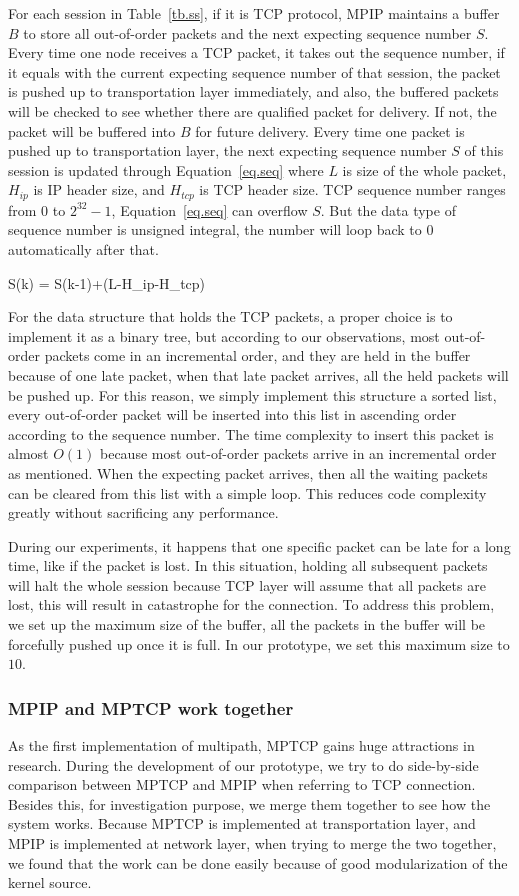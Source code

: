 For each session in Table~\ref{tb.ss}, if it is TCP protocol, MPIP maintains a buffer $B$ to store all out-of-order packets and the next expecting sequence number $S$. Every time one node receives a TCP packet, it takes out the sequence number, if it equals with the current expecting sequence number of that session, the packet is pushed up to transportation layer immediately, and also, the buffered packets will be checked to see whether there are qualified packet for delivery. If not, the packet will be buffered into $B$ for future delivery. Every time one packet is pushed up to transportation layer, the next expecting sequence number $S$ of this session is updated through Equation~\ref{eq.seq} where $L$ is size of the whole packet, $H_{ip}$ is IP header size, and $H_{tcp}$ is TCP header size. TCP sequence number ranges from $0$ to $2^{32}-1$, Equation~\ref{eq.seq} can overflow $S$. But the data type of sequence number is unsigned integral, the number will loop back to $0$ automatically after that. 

\be
\label{eq.seq}
S(k) = S(k-1)+(L-H_{ip}-H_{tcp})
\ee

For the data structure that holds the TCP packets, a proper choice is to implement it as a binary tree, but according to our observations, most out-of-order packets come in an incremental order, and they are held in the buffer because of one late packet, when that late packet arrives, all the held packets will be pushed up. For this reason, we simply implement this structure a sorted list, every out-of-order packet will be inserted into this list in ascending order according to the sequence number. The time complexity to insert this packet is almost $O(1)$ because most out-of-order packets arrive in an incremental order as mentioned.
When the expecting packet arrives, then all the waiting packets can be cleared from this list with a simple loop. This reduces code complexity greatly without sacrificing any performance.

During our experiments, it happens that one specific packet can be late for a long time, like if the packet is lost. In this situation, holding all subsequent packets will halt the whole session because TCP layer will assume that all packets are lost, this will result in catastrophe for the connection. To address this problem, we set up the maximum size of the buffer, all the packets in the buffer will be forcefully pushed up once it is full. In our prototype, we set this maximum size to $10$.

\subsubsection{MPIP and MPTCP work together}
\label{sec:together}
As the first implementation of multipath, MPTCP gains huge attractions in research. During the development of our prototype, we try to do side-by-side comparison between MPTCP and MPIP when referring to TCP connection. Besides this, for investigation purpose, we merge them together to see how the system works. Because MPTCP is implemented at transportation layer, and MPIP is implemented at network layer, when trying to merge the two together, we found that the work can be done easily because of good modularization of the kernel source. 

